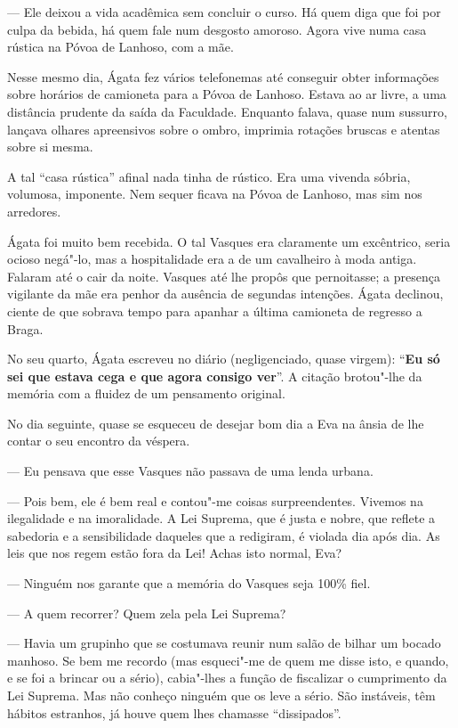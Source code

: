 --- Ele deixou a vida acadêmica sem concluir o curso. Há quem diga que
foi por culpa da bebida, há quem fale num desgosto amoroso. Agora
vive numa casa rústica na Póvoa de Lanhoso, com a mãe.

Nesse mesmo dia, Ágata fez vários telefonemas até conseguir obter
informações sobre horários de camioneta para a Póvoa de Lanhoso. Estava
ao ar livre, a uma distância prudente da saída da Faculdade. Enquanto
falava, quase num sussurro, lançava olhares apreensivos sobre o ombro,
imprimia rotações bruscas e atentas sobre si mesma.

A tal ``casa rústica'' afinal nada tinha de rústico. Era uma vivenda
sóbria, volumosa, imponente. Nem sequer ficava na Póvoa de Lanhoso, mas
sim nos arredores.

Ágata foi muito bem recebida. O tal Vasques era claramente um
excêntrico, seria ocioso negá"-lo, mas a hospitalidade era a de um
cavalheiro à moda antiga. Falaram até o cair da noite. Vasques até lhe
propôs que pernoitasse; a presença vigilante da mãe era penhor da
ausência de segundas intenções. Ágata declinou, ciente de que sobrava
tempo para apanhar a última camioneta de regresso a Braga.

No seu quarto, Ágata escreveu no diário (negligenciado, quase virgem):
``\textbf{Eu só sei que estava cega e que agora consigo ver}''. A
citação brotou"-lhe da memória com a fluidez de um pensamento original.

No dia seguinte, quase se esqueceu de desejar bom dia a Eva na ânsia de
lhe contar o seu encontro da véspera.

--- Eu pensava que esse Vasques não passava de uma lenda urbana.

--- Pois bem, ele é bem real e contou"-me coisas surpreendentes.
Vivemos na ilegalidade e na imoralidade. A Lei Suprema, que é justa
e nobre, que reflete a sabedoria e a sensibilidade daqueles que a
redigiram, é violada dia após dia. As leis que
nos regem estão fora da Lei! Achas isto normal, Eva?

--- Ninguém nos garante que a memória do Vasques seja 100\% fiel.

--- A quem recorrer? Quem zela pela Lei Suprema?

--- Havia um grupinho que se costumava reunir num salão de bilhar um
  bocado manhoso. Se bem me recordo (mas esqueci"-me de quem me disse
  isto, e quando, e se foi a brincar ou a sério), cabia"-lhes a função de
  fiscalizar o cumprimento da Lei Suprema. Mas não conheço ninguém que
  os leve a sério. São instáveis, têm hábitos estranhos, já houve quem
  lhes chamasse ``dissipados''.

